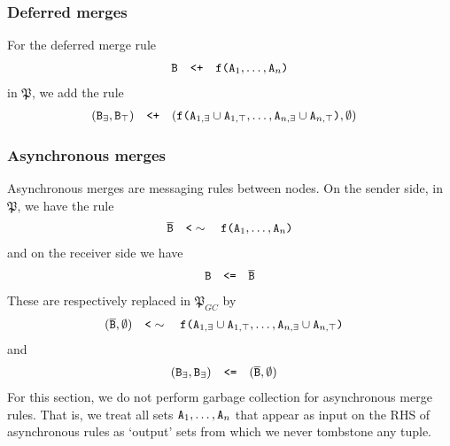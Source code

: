 \documentclass{article}
\numberwithin{equation}{section}
\renewcommand{\tt}[1]{\ifmmode\text{\texttt{#1}}\else\texttt{#1}\fi}
\begin{document}
\subsubsection{Deferred merges}
For the deferred merge rule
\begin{align}
\tt{B} \quad\tt{<+}\quad \tt{f(}\tt{A}_1,\dots,\tt{A}_n\tt{)}
\end{align}
in $\mathfrak{P}$, we add the rule
\begin{align*}
(\tt{B}_\exists, \tt{B}_\top) &\quad\tt{<+}\quad (\tt{f(}\tt{A}_{1,\exists} \cup \tt{A}_{1,\top},\dots,\tt{A}_{n,\exists} \cup \tt{A}_{n,\top}\tt{)}, \emptyset)
\end{align*}

\subsubsection{Asynchronous merges}
Asynchronous merges are messaging rules between nodes.
On the sender side, in $\mathfrak{P}$, we have the rule 
\begin{align}
\overline{\tt{B}} \quad\tt{<}\sim\quad \tt{f(}\tt{A}_1,\dots,\tt{A}_n\tt{)}
\end{align}
and on the receiver side we have
\begin{align}
\tt{B} \quad\tt{<=}\quad \overline{\tt{B}}
\end{align}
These are respectively replaced in $\mathfrak{P}_{GC}$ by
\begin{align}
(\overline{\tt{B}}, \emptyset) &\quad\tt{<}\sim\quad \tt{f(}\tt{A}_{1,\exists} \cup \tt{A}_{1,\top},\dots,\tt{A}_{n,\exists} \cup \tt{A}_{n,\top}\tt{)}
\end{align}
and
\begin{align}
(\tt{B}_\exists, \tt{B}_\exists) &\quad\tt{<=}\quad (\overline{\tt{B}}, \emptyset)
\end{align}
For this section, we do not perform garbage collection for asynchronous merge rules.
That is, we treat all sets $\tt{A}_1, \dots, \tt{A}_n$ that appear as input on the RHS of asynchronous rules as `output' sets from which we never tombstone any tuple.
\end{document}

